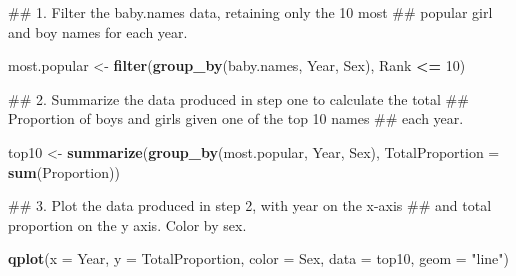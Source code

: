 \documentclass[]{book}
\newenvironment{Shaded}{\begin{snugshade}}{\end{snugshade}}
\newcommand{\KeywordTok}[1]{\textcolor[rgb]{0.13,0.29,0.53}{\textbf{#1}}}
\newcommand{\DataTypeTok}[1]{\textcolor[rgb]{0.13,0.29,0.53}{#1}}
\newcommand{\DecValTok}[1]{\textcolor[rgb]{0.00,0.00,0.81}{#1}}
\newcommand{\StringTok}[1]{\textcolor[rgb]{0.31,0.60,0.02}{#1}}
\newcommand{\OperatorTok}[1]{\textcolor[rgb]{0.81,0.36,0.00}{\textbf{#1}}}
\newcommand{\NormalTok}[1]{#1}
\begin{document}
\begin{Shaded}
\begin{Highlighting}[]
\NormalTok{## 1.  Filter the baby.names data, retaining only the 10 most }
\NormalTok{##     popular girl and boy names for each year.}
\end{Highlighting}
\end{Shaded}

\begin{Shaded}
\begin{Highlighting}[]
\NormalTok{most.popular <-}\StringTok{ }\KeywordTok{filter}\NormalTok{(}\KeywordTok{group_by}\NormalTok{(baby.names, Year, Sex),}
\NormalTok{                       Rank }\OperatorTok{<=}\StringTok{ }\DecValTok{10}\NormalTok{)}
\end{Highlighting}
\end{Shaded}

\begin{Shaded}
\begin{Highlighting}[]
\NormalTok{## 2.  Summarize the data produced in step one to calculate the total}
\NormalTok{##     Proportion of boys and girls given one of the top 10 names}
\NormalTok{##     each year.}
\end{Highlighting}
\end{Shaded}

\begin{Shaded}
\begin{Highlighting}[]
\NormalTok{top10 <-}\StringTok{ }\KeywordTok{summarize}\NormalTok{(}\KeywordTok{group_by}\NormalTok{(most.popular, Year, Sex),}
                   \DataTypeTok{TotalProportion =} \KeywordTok{sum}\NormalTok{(Proportion))}
\end{Highlighting}
\end{Shaded}

\begin{Shaded}
\begin{Highlighting}[]
\NormalTok{## 3.  Plot the data produced in step 2, with year on the x-axis}
\NormalTok{##     and total proportion on the y axis. Color by sex.}
\end{Highlighting}
\end{Shaded}

\begin{Shaded}
\begin{Highlighting}[]
\KeywordTok{qplot}\NormalTok{(}\DataTypeTok{x =}\NormalTok{ Year, }\DataTypeTok{y =}\NormalTok{ TotalProportion, }\DataTypeTok{color =}\NormalTok{ Sex,}
      \DataTypeTok{data =}\NormalTok{ top10,}
      \DataTypeTok{geom =} \StringTok{"line"}\NormalTok{)}
\end{Highlighting}
\end{Shaded}
\end{document}
